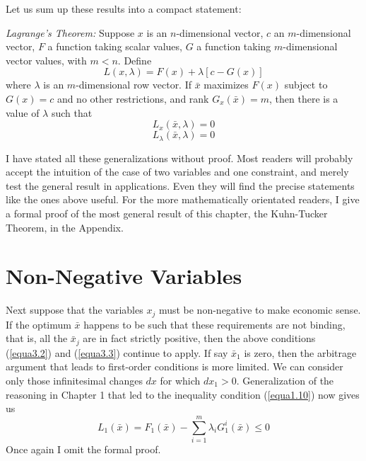 Let us sum up these results into a compact statement:

\textit{Lagrange's Theorem:} Suppose $x$ is an $n$-dimensional vector, $c$ an $m$-dimensional vector, $F$ a function taking scalar values, $G$ a function taking $m$-dimensional vector values, with $m<n$. Define
\begin{equation*} \tag{3.4}
L(x, \lambda) = F(x ) + \lambda[c-G(x)]
\end{equation*}
where $\lambda$ is an $m$-dimensional row vector. If $\bar{x}$ maximizes $F(x)$ subject to $G(x)=c$ and no other restrictions, and rank $G_x(\bar{x})=m$, then there is a value of $\lambda$ such that
\begin{equation*} \tag{3.5}
L_x(\bar{x}, \lambda) = 0
\end{equation*}
\begin{equation*} \tag{3.6}
L_\lambda(\bar{x}, \lambda) = 0
\end{equation*}

I have stated all these generalizations without proof. Most readers will probably accept the intuition of the case of two variables and one constraint, and merely test the general result in applications. Even they will find the precise statements like the ones above useful. For the more mathematically orientated readers, I give a formal proof of the most general result of this chapter, the Kuhn-Tucker Theorem, in the Appendix.

\section*{Non-Negative Variables}

Next suppose that the variables $x_j$ must be non-negative to make economic sense. If the optimum $\bar{x}$ happens to be such that these requirements are not binding, that is, all the $\bar{x}_j$ are in fact strictly positive, then the above conditions (\ref{equa3.2}) and (\ref{equa3.3}) continue to apply. If say $\bar{x}_1$ is zero, then the arbitrage argument that leads to first-order conditions is more limited. We can consider only those infinitesimal changes $dx$ for which $dx_1 >0$. Generalization of the reasoning in Chapter 1 that led to the inequality condition (\ref{equa1.10}) now gives us
\begin{equation*}
L_1(\bar{x})   = F_1(\bar{x}) - \sum_{i=1}^m \lambda_i G_1^i(\bar{x}) \leq 0
\end{equation*}
Once again I omit the formal proof.

